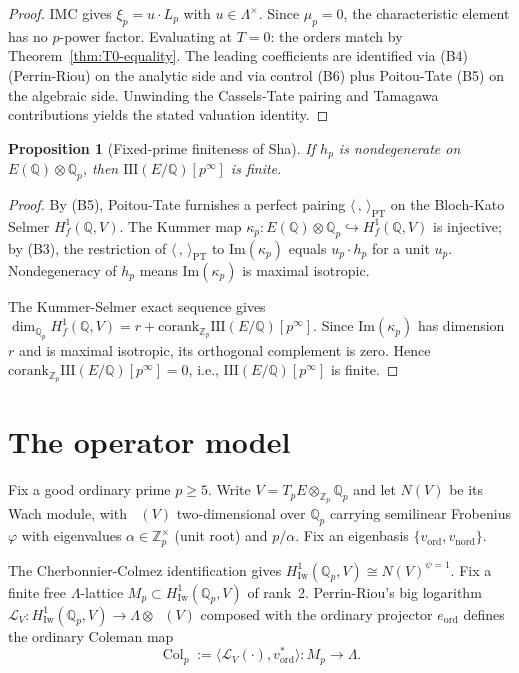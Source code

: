\documentclass[12pt,reqno]{amsart}
\newtheorem{proposition}[theorem]{Proposition}
\theoremstyle{definition}
\theoremstyle{remark}
\newcommand{\Q}{\mathbb{Q}}
\newcommand{\Qp}{\mathbb{Q}_p}
\newcommand{\Zp}{\mathbb{Z}_p}
\newcommand{\Lam}{\Lambda}
\newcommand{\Sha}{\mathrm{III}}
\newcommand{\ShaE}{\Sha(E/\Q){}}
\newcommand{\corank}{\mathrm{corank}}
\DeclareMathOperator{\Col}{Col}
\DeclareMathOperator{\Dcris}{D_{\mathrm{cris}}}
\begin{document}
\begin{proof}
IMC gives $\xi_p=u\cdot L_p$ with $u\in\Lam^\times$.  Since $\mu_p=0$, the characteristic element has no $p$-power factor.  Evaluating at $T=0$: the orders match by Theorem~\ref{thm:T0-equality}.  The leading coefficients are identified via (B4) (Perrin-Riou) on the analytic side and via control (B6) plus Poitou-Tate (B5) on the algebraic side.  Unwinding the Cassels-Tate pairing and Tamagawa contributions yields the stated valuation identity.
\end{proof}

\begin{proposition}[Fixed-prime finiteness of Sha]\label{prop:sha-finite}
If $h_p$ is nondegenerate on $E(\Q)\otimes\Qp$, then $\ShaE[p^\infty]$ is finite.
\end{proposition}

\begin{proof}
By (B5), Poitou-Tate furnishes a perfect pairing $\langle\,,\,\rangle_{\mathrm{PT}}$ on the Bloch-Kato Selmer $H^1_f(\Q,V)$.  The Kummer map $\kappa_p:E(\Q)\otimes\Qp\hookrightarrow H^1_f(\Q,V)$ is injective; by (B3), the restriction of $\langle\,,\,\rangle_{\mathrm{PT}}$ to $\mathrm{Im}(\kappa_p)$ equals $u_p\cdot h_p$ for a unit $u_p$.  Nondegeneracy of $h_p$ means $\mathrm{Im}(\kappa_p)$ is maximal isotropic.

The Kummer-Selmer exact sequence gives $\dim_{\Qp}H^1_f(\Q,V)=r+\corank_{\Zp}\ShaE[p^\infty]$.  Since $\mathrm{Im}(\kappa_p)$ has dimension $r$ and is maximal isotropic, its orthogonal complement is zero.  Hence $\corank_{\Zp}\ShaE[p^\infty]=0$, i.e., $\ShaE[p^\infty]$ is finite.
\end{proof}

\section{The operator model}\label{sec:operator}

Fix a good ordinary prime $p\ge 5$.  Write $V=T_pE\otimes_{\Zp}\Qp$ and let $N(V)$ be its Wach module, with $\Dcris(V)$ two-dimensional over $\Qp$ carrying semilinear Frobenius $\varphi$ with eigenvalues $\alpha\in\Zp^\times$ (unit root) and $p/\alpha$.  Fix an eigenbasis $\{v_{\mathrm{ord}},v_{\mathrm{nord}}\}$.

The Cherbonnier-Colmez identification \cite{CC} gives $H^1_{\mathrm{Iw}}(\Qp,V)\cong N(V)^{\psi=1}$.  Fix a finite free $\Lam$-lattice $M_p\subset H^1_{\mathrm{Iw}}(\Qp,V)$ of rank~2.  Perrin-Riou's big logarithm $\mathcal L_V:H^1_{\mathrm{Iw}}(\Qp,V)\to\Lam\otimes\Dcris(V)$ composed with the ordinary projector $e_{\mathrm{ord}}$ defines the ordinary Coleman map
\begin{equation}\label{eq:colmap}
\Col_p:=\langle\mathcal L_V(\cdot),v_{\mathrm{ord}}^*\rangle:M_p\longrightarrow\Lam.
\end{equation}
\end{document}
